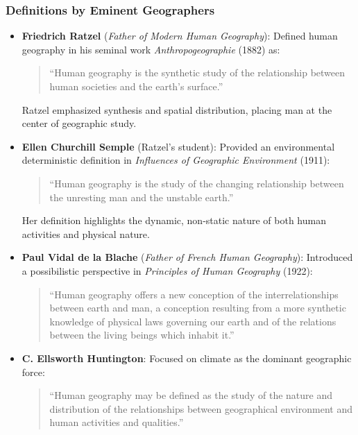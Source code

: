 \documentclass[11pt,a4paper]{article}
\begin{document}
\subsubsection{Definitions by Eminent Geographers}
\begin{itemize}[leftmargin=*]
  \item \textbf{Friedrich Ratzel} (\textit{Father of Modern Human Geography}): Defined human geography in his seminal work \textit{Anthropogeographie} (1882) as:
  \begin{quote}
    ``Human geography is the synthetic study of the relationship between human societies and the earth's surface.''
  \end{quote}
  Ratzel emphasized synthesis and spatial distribution, placing man at the center of geographic study.
  
  \item \textbf{Ellen Churchill Semple} (Ratzel's student): Provided an environmental deterministic definition in \textit{Influences of Geographic Environment} (1911):
  \begin{quote}
    ``Human geography is the study of the changing relationship between the unresting man and the unstable earth.''
  \end{quote}
  Her definition highlights the dynamic, non-static nature of both human activities and physical nature.
  
  \item \textbf{Paul Vidal de la Blache} (\textit{Father of French Human Geography}): Introduced a possibilistic perspective in \textit{Principles of Human Geography} (1922):
  \begin{quote}
    ``Human geography offers a new conception of the interrelationships between earth and man, a conception resulting from a more synthetic knowledge of physical laws governing our earth and of the relations between the living beings which inhabit it.''
  \end{quote}
  
  \item \textbf{C. Ellsworth Huntington}: Focused on climate as the dominant geographic force:
  \begin{quote}
    ``Human geography may be defined as the study of the nature and distribution of the relationships between geographical environment and human activities and qualities.''
  \end{quote}
\end{itemize}
\end{document}
